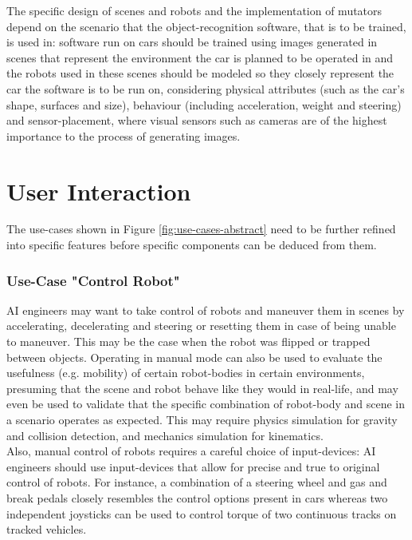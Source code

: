 The specific design of scenes and robots and the implementation of mutators depend on the scenario that the object-recognition software, that is to be trained, is used in: software run on cars should be trained using images generated in scenes that represent the environment the car is planned to be operated in and the robots used in these scenes should be modeled so they closely represent the car the software is to be run on, considering physical attributes (such as the car's shape, surfaces and size), behaviour (including acceleration, weight and steering)  and sensor-placement, where visual sensors such as cameras are of the highest importance to the process of generating images.


\section{User Interaction}
The use-cases shown in Figure \ref{fig:use-cases-abstract} need to be further refined into specific features before specific components can be deduced from them.

\subsubsection{Use-Case "Control Robot"}
\acs{AI} engineers may want to take control of robots and maneuver them in scenes by accelerating, decelerating and steering or resetting them in case of being unable to maneuver. This may be the case when the robot was flipped or trapped between objects. Operating in manual mode can also be used to evaluate the usefulness (e.g. mobility) of certain robot-bodies in certain environments, presuming that the scene and robot behave like they would in real-life, and may even be used to validate that the specific combination of robot-body and scene in a scenario operates as expected. This may require physics simulation for gravity and collision detection, and mechanics simulation for kinematics.\\
Also, manual control of robots requires a careful choice of input-devices: \acs{AI} engineers should use input-devices that allow for precise and true to original control of robots. For instance, a combination of a steering wheel and gas and break pedals closely resembles the control options present in cars whereas two independent joysticks can be used to control torque of two continuous tracks on tracked vehicles.

